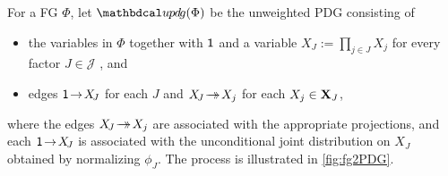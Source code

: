 \documentclass{article}
\begin{document}
	\begin{defn} \label{def:fg2PDG}
	For a FG $\Phi$, let $\UPDGof{\Phi}$ be
	the unweighted PDG consisting of
	\begin{itemize}
		\item the variables in $\Phi$ together
	   with $\mathsf{1}$ and a variable $X_{\!J} := \prod_{j \in J} X_j$ for every factor $J \in \mathcal J$%
	   , and
	   \item edges ${\mathsf{1}} \!\to\! X_{\!J}$ for each $J$ and $X_{\!J} \!\rightarrow\mathrel{\mspace{-15mu}}\rightarrow\! X_j$ for each $X_j \in \mathbf X_J$,
	\end{itemize}
	where the edges $ X_{\!J} \!\rightarrow\mathrel{\mspace{-15mu}}\rightarrow\! X_j$ are associated with the appropriate projections, and each ${\mathsf{1}} \!\to\! X_{\!J}$ is associated with the unconditional joint distribution on $X_J$ obtained by normalizing $\phi_J$.
	The process is illustrated in \cref{fig:fg2PDG}.
	\end{defn}
	
\end{document}
